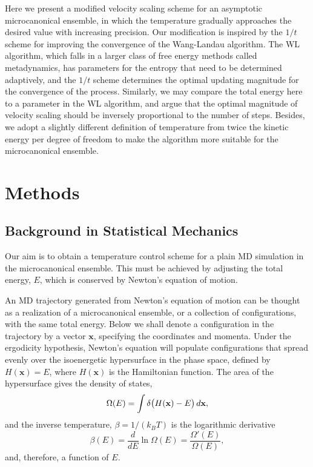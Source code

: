 \documentclass[reprint]{revtex4-1}
\begin{document}
Here we present a modified velocity scaling scheme
for an asymptotic microcanonical ensemble,
in which
the temperature gradually approaches the desired value with increasing precision.
%
Our modification is inspired by the $1/t$ scheme\cite{
  belardinelli2007, belardinelli2007jcp, belardinelli2008,
  zhou2005, zhou2008, morozov2007}
for improving the convergence of the Wang-Landau algorithm\cite{
  wang2001, wang2001pre}.
The WL algorithm,
which falls in a larger class of free energy methods
called metadynamics\cite{
  laio2002, laio2008, marsili2006},
has parameters for the entropy that need to be
determined adaptively,
and the $1/t$ scheme determines the optimal updating magnitude
for the convergence of the process.
%
Similarly, we may compare the total energy here
to a parameter in the WL algorithm,
and argue that the optimal magnitude
of velocity scaling should be inversely proportional
to the number of steps.
%
Besides, we adopt a slightly different definition of temperature\cite{rugh1997}
from twice the kinetic energy per degree of freedom
to make the algorithm more suitable for the microcanonical ensemble.



\section{Methods}



\subsection{Background in Statistical Mechanics}



Our aim is to obtain a temperature control scheme
for a plain MD simulation in the microcanonical ensemble.
%
This must be achieved by adjusting the total energy, $E$,
which is conserved by Newton's equation of motion.


An MD trajectory generated from
Newton's equation of motion
can be thought as a realization
of a microcanonical ensemble,
or a collection of configurations,
with the same total energy.
%
Below we shall denote a configuration in the trajectory
by a vector $\mathbf x$,
specifying the coordinates and momenta.
%
Under the ergodicity hypothesis,
Newton's equation will populate configurations
that spread evenly over
the isoenergetic hypersurface in the phase space,
defined by
$H(\mathbf x) = E$,
where $H(\mathbf x)$ is the Hamiltonian function.
%
The area of the hypersurface gives the density of states,
%
\begin{equation}
  \Omega(E)
  =
  \int
    \delta\bigl( H(\mathbf x) - E \bigr)
    \, d\mathbf x
  ,
  \notag
\end{equation}
%
and the inverse temperature, $\beta = 1/(k_B T)$
is the logarithmic derivative
%
\begin{equation}
  \beta(E)
  =
  \frac{ d }{ dE }
  \ln \Omega(E)
  =
  \frac{ \Omega'(E) }
       { \Omega(E)  }
  ,
  \label{eq:betaE_def}
\end{equation}
%
and, therefore, a function of $E$.
%
\end{document}
